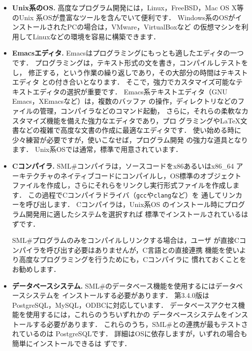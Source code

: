 \documentclass{jbook}
\newcommand{\smlsharp}{SML\#}
\newcommand{\version}{3.4.0}
\begin{document}
\begin{itemize}
\item {\bf Unix系のOS.}
	高度なプログラム開発には，Linux，FreeBSD，Mac OS X等のUnix
系OSが豊富なツールを含んでいて便利です．
	Windows系のOSがインストールされたPCの場合は，VMware，VirtualBoxなど
の仮想マシンを利用してLinuxなどの環境を容易に構築できます．

\item {\bf Emacsエディタ.}
	Emacsはプログラミングにもっとも適したエディタの一つです．
	プログラミングは，テキスト形式の文を書き，コンパイルしテストをし，
修正する，という作業の繰り返しであり，その大部分の時間はテキストエディタ
との付き合いとなります．
	そこで，強力でカスタマイズ可能なテキストエディタの選択が重要です．
	Emacs系テキストエディタ（GNU Emacs，XEmacsなど）は，複数のバッファ
の操作，ディレクトリなどのファイルの管理，コンパイラなどのコマンド起動，
さらに，それらの柔軟なカスタマイズ機能を備えた強力なエディタであり，プロ
グラミングやLaTeX文書などの複雑で高度な文書の作成に最適なエディタです．
	使い始める時に少々練習が必要ですが，使いこなせば，プログラム開発
の強力な道具となります．
	Unix系OSでは通常，標準で用意されています．

\item {\bf Cコンパイラ.}
	\smlsharp{}コンパイラは，ソースコードをx86あるいはx86\_64
アーキテクチャのネイティブコードにコンパイルし，OS標準のオブジェクト
ファイルを作成し，さらにそれらをリンクし実行形式ファイルを作成します．
	この過程でCコンパイラドライバ（{\tt gcc}や{\tt clang}など）を
通してリンカーを呼び出します．
	Cコンパイラは，Unix系OS%
のインストール時にプログラム開発用に適したシステムを選択すれば
標準でインストールされているはずです．

	\smlsharp{}プログラムのみをコンパイルしリンクする場合は，ユーザ
が直接Cコンパイラを呼び出す必要はありませんが，C言語との直接連携
機能を使いより高度なプログラミングを行うためにも，Cコンパイラに
慣れておくことをお勧めします．

\item {\bf データベースシステム.}
	\smlsharp{}のデータベース機能を使用するにはデータベースシステムを
インストールする必要があります．
	第\version{}版はPostgreSQL，MySQL，ODBCに対応しています．
	データベースアクセス機能を使用するには，これらのうちいずれかの
データベースシステムをインストールする必要があります．
	これらのうち，\smlsharp{}との連携が最もテストされているのは
PostgreSQLです．
	詳細はOSに依存しますが，いずれの場合も簡単にインストールできるは
ずです．
\end{itemize}
\end{document}
